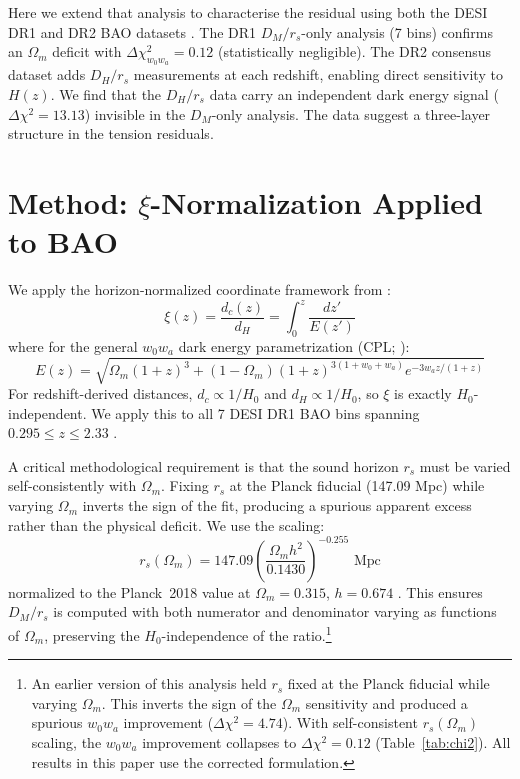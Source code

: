 \documentclass[12pt,a4paper]{article}
\begin{document}
Here we extend that analysis to characterise the residual using both the DESI
DR1 and DR2 BAO datasets \citep{DESI_2024_DR1, DESI_2024_w0wa, DESI_2025_DR2}.
The DR1 $D_M/r_s$-only analysis (7 bins) confirms an $\Omega_m$ deficit with
$\Delta\chi^2_{w_0w_a} = 0.12$ (statistically negligible). The DR2 consensus
dataset adds $D_H/r_s$ measurements at each redshift, enabling direct
sensitivity to $H(z)$. We find that the $D_H/r_s$ data carry an independent
dark energy signal ($\Delta\chi^2 = 13.13$) invisible in the $D_M$-only
analysis. The data suggest a three-layer structure in the tension residuals.

\section{Method: $\xi$-Normalization Applied to BAO}

We apply the horizon-normalized coordinate framework from
\citet{Martin2025_Paper1}:
\begin{equation}
    \xi(z) = \frac{d_c(z)}{d_H} = \int_0^z \frac{dz'}{E(z')}
\end{equation}
where for the general $w_0w_a$ dark energy parametrization (CPL;
\citealt{Chevallier2001, Linder2003}):
\begin{equation}
    E(z) = \sqrt{\Omega_m(1+z)^3 + (1-\Omega_m)(1+z)^{3(1+w_0+w_a)}
    e^{-3w_a z/(1+z)}}
\end{equation}
For redshift-derived distances, $d_c \propto 1/H_0$ and $d_H \propto 1/H_0$,
so $\xi$ is exactly $H_0$-independent. We apply this to all 7 DESI DR1 BAO
bins spanning $0.295 \leq z \leq 2.33$ \citep{DESI_2024_DR1}.

A critical methodological requirement is that the sound horizon $r_s$ must be
varied self-consistently with $\Omega_m$. Fixing $r_s$ at the Planck fiducial
(147.09 Mpc) while varying $\Omega_m$ inverts the sign of the fit, producing a
spurious apparent excess rather than the physical deficit. We use the
\citealt{Percival2007} scaling:
\begin{equation}
    r_s(\Omega_m) = 147.09 \left(\frac{\Omega_m h^2}{0.1430}\right)^{-0.255}
    \text{ Mpc}
\end{equation}
normalized to the Planck~2018 value at $\Omega_m = 0.315$, $h = 0.674$
\citep{Planck2020}. This ensures $D_M/r_s$ is computed with both numerator and
denominator varying as functions of $\Omega_m$, preserving the $H_0$-independence
of the ratio.\footnote{An earlier version of this analysis held $r_s$ fixed at
the Planck fiducial while varying $\Omega_m$. This inverts the sign of the
$\Omega_m$ sensitivity and produced a spurious $w_0w_a$ improvement
($\Delta\chi^2 = 4.74$). With self-consistent $r_s(\Omega_m)$ scaling, the
$w_0w_a$ improvement collapses to $\Delta\chi^2 = 0.12$ (Table~\ref{tab:chi2}).
All results in this paper use the corrected formulation.}
\end{document}
